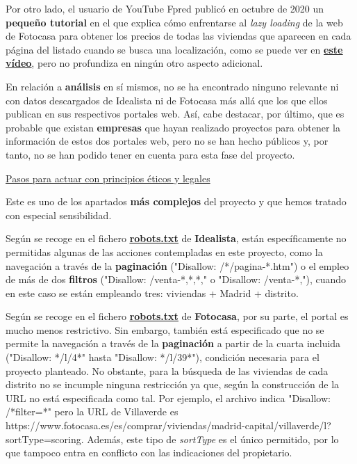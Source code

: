 \documentclass[12pt]{article}
\begin{document}
Por otro lado, el usuario de YouTube Fpred publicó en octubre de 2020 un \textbf{pequeño tutorial} en el que explica cómo enfrentarse al \textit{lazy loading} de la web de Fotocasa para obtener los precios de todas las viviendas que aparecen en cada página del listado cuando se busca una localización, como se puede ver en \href{https://www.youtube.com/watch?v=WMjV7rF3oX8}{\textbf{\underline{este vídeo}}}, pero no profundiza en ningún otro aspecto adicional. 

En relación a \textbf{análisis} en sí mismos, no se ha encontrado ninguno relevante ni con datos descargados de Idealista ni de Fotocasa más allá que los que ellos publican en sus respectivos portales web. Así, cabe destacar, por último, que es probable que existan \textbf{empresas} que hayan realizado proyectos para obtener la información de estos dos portales web, pero no se han hecho públicos y, por tanto, no se han podido tener en cuenta para esta fase del proyecto. 

\underline{Pasos para actuar con principios éticos y legales}

Este es uno de los apartados\textbf{ más complejos} del proyecto y que hemos tratado con especial sensibilidad.

Según se recoge en el fichero \href{https://www.idealista.com/robots.txt}{\textbf{\underline{robots.txt}}} de \textbf{Idealista}, están específicamente no permitidas algunas de las acciones contempladas en este proyecto, como la navegación a través de la \textbf{paginación} ("Disallow: /*/pagina-*.htm") o el empleo de más de dos \textbf{filtros} ("Disallow: /venta-*,*,*," o "Disallow: /venta-*,"), cuando en este caso se están empleando tres: viviendas + Madrid + distrito. 

Según se recoge en el fichero \href{https://www.fotocasa.es/robots.txt}{\textbf{\underline{robots.txt}}} de \textbf{Fotocasa}, por su parte, el portal es mucho menos restrictivo. Sin embargo, también está especificado que no se permite la navegación a través de la \textbf{paginación} a partir de la cuarta incluida ("Disallow: */l/4*" hasta "Disallow: */l/39*"), condición necesaria para el proyecto planteado. No obstante, para la búsqueda de las viviendas de cada distrito no se incumple ninguna restricción ya que, según la construcción de la URL no está especificada como tal. Por ejemplo, el archivo indica "Disallow: /*filter=*" pero la URL de Villaverde es https://www.fotocasa.es/es/comprar/viviendas/madrid-capital/villaverde/l?sortType=scoring. Además, este tipo de \textit{sortType} es el único permitido, por lo que tampoco entra en conflicto con las indicaciones del propietario. 
\end{document}
